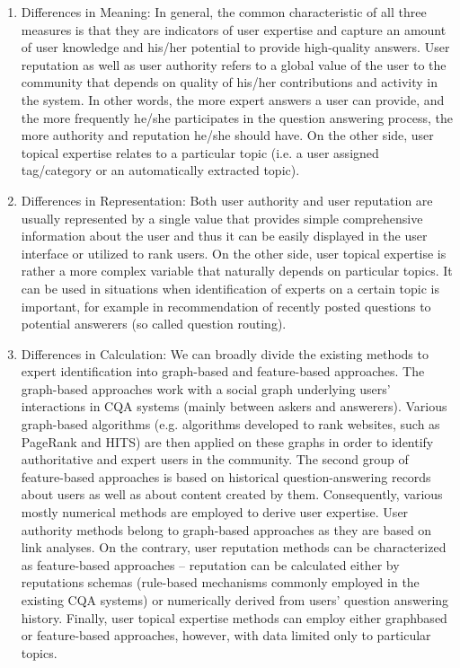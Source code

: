 \documentclass{llncs}
\begin{document}
		\begin{enumerate}
			\item Differences in Meaning: In general, the common characteristic of all three
			measures is that they are indicators of user expertise and capture an amount
			of user knowledge and his/her potential to provide high-quality answers. User
			reputation as well as user authority refers to a global value of the user to the
			community that depends on quality of his/her contributions and activity in
			the system. In other words, the more expert answers a user can provide,
			and the more frequently he/she participates in the question answering process,
			the more authority and reputation he/she should have. On the other
			side, user topical expertise relates to a particular topic (i.e. a user assigned
			tag/category or an automatically extracted topic).
			\item Differences in Representation: Both user authority and user reputation are
			usually represented by a single value that provides simple comprehensive
			information about the user and thus it can be easily displayed in the user
			interface or utilized to rank users. On the other side, user topical expertise is
			rather a more complex variable that naturally depends on particular topics.
			It can be used in situations when identification of experts on a certain topic
			is important, for example in recommendation of recently posted questions
			to potential answerers (so called question routing).
			\item Differences in Calculation: We can broadly divide the existing methods to
			expert identification into graph-based and feature-based approaches. The
			graph-based approaches work with a social graph underlying users’ interactions
			in CQA systems (mainly between askers and answerers). Various
			graph-based algorithms (e.g. algorithms developed to rank websites, such as
			PageRank and HITS) are then applied on these graphs in order to identify
			authoritative and expert users in the community. The second group of
			feature-based approaches is based on historical question-answering records
			about users as well as about content created by them. Consequently, various
			mostly numerical methods are employed to derive user expertise.
			User authority methods belong to graph-based approaches as they are based
			on link analyses. On the contrary, user reputation methods can be characterized
			as feature-based approaches – reputation can be calculated either by
			reputations schemas (rule-based mechanisms commonly employed in the existing
			CQA systems) or numerically derived from users’ question answering
			history. Finally, user topical expertise methods can employ either graphbased
			or feature-based approaches, however, with data limited only to particular
			topics.
		\end{enumerate}
\end{document}
